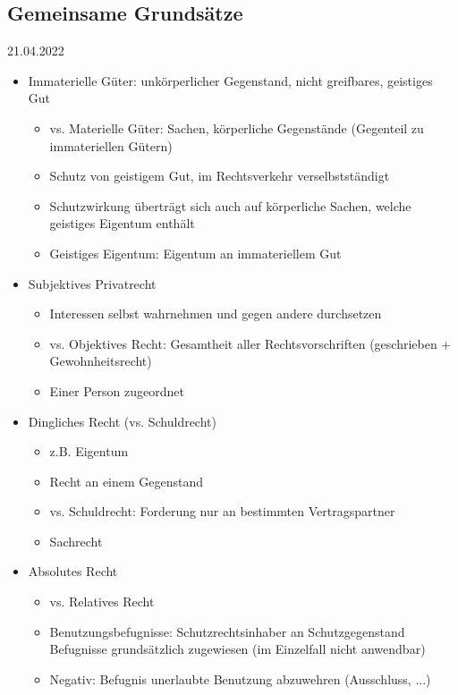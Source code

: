 \documentclass{report}
\begin{document}
\subsection{Gemeinsame Grundsätze}
21.04.2022
\begin{itemize}
	\item Immaterielle Güter:
	\newline unkörperlicher Gegenstand, nicht greifbares, geistiges Gut
	\begin{itemize}
		\item vs. Materielle Güter: Sachen, körperliche Gegenstände (Gegenteil zu immateriellen Gütern)
		\item Schutz von geistigem Gut, im Rechtsverkehr verselbstständigt
		\item Schutzwirkung überträgt sich auch auf körperliche Sachen, welche geistiges Eigentum enthält
		\item Geistiges Eigentum: Eigentum an immateriellem Gut
	\end{itemize}
	\item Subjektives Privatrecht
	\begin{itemize}
		\item Interessen selbst wahrnehmen und gegen andere durchsetzen
		\item vs. Objektives Recht: Gesamtheit aller Rechtsvorschriften (geschrieben + Gewohnheitsrecht)
		\item Einer Person zugeordnet
	\end{itemize}
	\item Dingliches Recht (vs. Schuldrecht)
	\begin{itemize}
		\item z.B. Eigentum
		\item Recht an einem Gegenstand
		\item vs. Schuldrecht: Forderung nur an bestimmten Vertragspartner
		\item Sachrecht
	\end{itemize}
	\item Absolutes Recht
	\begin{itemize}
		\item vs. Relatives Recht
		\item Benutzungsbefugnisse: Schutzrechtsinhaber an Schutzgegenstand
		\newline Befugnisse grundsätzlich zugewiesen (im Einzelfall nicht anwendbar)
		\item Negativ: Befugnis unerlaubte Benutzung abzuwehren (Ausschluss, ...)
	\end{itemize}
\end{itemize}
\end{document}
